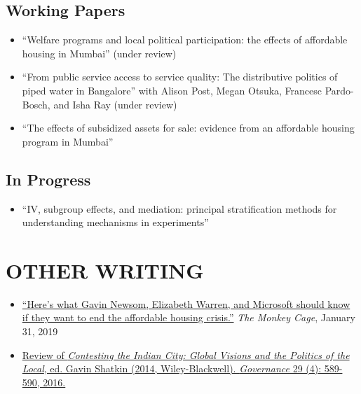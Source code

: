 \documentclass[12pt]{article}
\begin{document}
\subsection*{Working Papers}

\begin{itemize}
	\item[]``Welfare programs and local political participation: the effects of affordable housing in Mumbai'' (under review)

		\item[]``From public service access to service quality: The distributive politics of piped water in Bangalore'' with Alison Post, Megan Otsuka, Francesc Pardo-Bosch, and Isha Ray (under review)
		\item[]``The effects of subsidized assets for sale: evidence from an affordable housing program in Mumbai'' 
		\end{itemize}

\subsection*{In Progress}
\begin{itemize}
	\item[] ``IV, subgroup effects, and mediation: principal stratification methods for understanding mechanisms in experiments''
	\end{itemize}
\vspace{5mm}
\section*{OTHER WRITING}
\begin{itemize}
\item[]\href{https://www.washingtonpost.com/news/monkey-cage/wp/2019/01/31/heres-what-gavin-newsom-elizabeth-warren-and-microsoft-should-know-if-want-to-end-the-affordable-housing-crisis/?tid=sm_tw_cage}{``Here's what Gavin Newsom, Elizabeth Warren, and Microsoft should know if they want to end the affordable housing crisis.''} \textit{The Monkey Cage}, January 31, 2019
\item[] \href{http://onlinelibrary.wiley.com/doi/10.1111/gove.12241/abstract}{Review of \textit{Contesting the Indian City: Global Visions and the Politics of the Local}, ed. Gavin Shatkin (2014, Wiley-Blackwell). \textit{Governance} 29 (4): 589-590, 2016.} \
\end{itemize}


\vspace{5mm}
\end{document}
